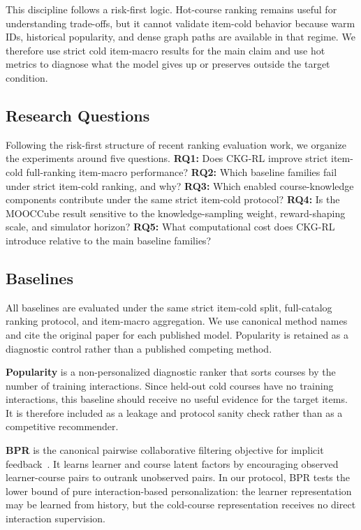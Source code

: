 \documentclass[sigconf,anonymous,review]{acmart}
\begin{document}
This discipline follows a risk-first logic. Hot-course ranking remains useful for understanding trade-offs, but it cannot validate item-cold behavior because warm IDs, historical popularity, and dense graph paths are available in that regime. We therefore use strict cold item-macro results for the main claim and use hot metrics to diagnose what the model gives up or preserves outside the target condition.

\subsection{Research Questions}
Following the risk-first structure of recent ranking evaluation work, we organize the experiments around five questions. \textbf{RQ1:} Does CKG-RL improve strict item-cold full-ranking item-macro performance? \textbf{RQ2:} Which baseline families fail under strict item-cold ranking, and why? \textbf{RQ3:} Which enabled course-knowledge components contribute under the same strict item-cold protocol? \textbf{RQ4:} Is the MOOCCube result sensitive to the knowledge-sampling weight, reward-shaping scale, and simulator horizon? \textbf{RQ5:} What computational cost does CKG-RL introduce relative to the main baseline families?

\subsection{Baselines}
All baselines are evaluated under the same strict item-cold split, full-catalog ranking protocol, and item-macro aggregation. We use canonical method names and cite the original paper for each published model. Popularity is retained as a diagnostic control rather than a published competing method.

\textbf{Popularity} is a non-personalized diagnostic ranker that sorts courses by the number of training interactions. Since held-out cold courses have no training interactions, this baseline should receive no useful evidence for the target items. It is therefore included as a leakage and protocol sanity check rather than as a competitive recommender.

\textbf{BPR} is the canonical pairwise collaborative filtering objective for implicit feedback~\cite{rendle2009bpr}. It learns learner and course latent factors by encouraging observed learner-course pairs to outrank unobserved pairs. In our protocol, BPR tests the lower bound of pure interaction-based personalization: the learner representation may be learned from history, but the cold-course representation receives no direct interaction supervision.
\end{document}
